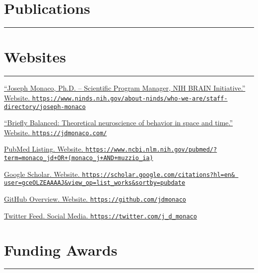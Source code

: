 \documentclass[10pt]{article}
\newcommand{\itemtitle}[1]{{\color{hopkinsblue}\ul{#1}}}
\newcommand{\itemnote}[1]{
  \begin{description}
    \item[$\rightarrow$] \hspace{.09in}{\color{darkgray}\it #1}
  \end{description}
}
\newcommand{\aurl}[1]{{\color{dimgray}\texttt{#1}}}
\newcommand{\newsection}[2]{%
  \section*{#1}
  \vspace{-.125in}
  \hrule
  \vspace{.22in}
  \label{sec:#2}
}
\begin{document}
\newsection{Publications}{pubs}

\renewcommand{\itemnote}[1]{}
%



\smallskip
\newsection{Websites}{web}

\begin{description}
  \item \href{https://www.ninds.nih.gov/about-ninds/who-we-are/staff-directory/joseph-monaco}
    {``\itemtitle{Joseph Monaco, Ph.D. -- Scientific
      Program Manager, NIH BRAIN Initiative}.'' Website.
    \aurl{https://www.ninds.nih.gov/about-ninds/who-we-are/staff-directory/joseph-monaco}}
  \item \href{https://jdmonaco.com/}
    {``\itemtitle{Briefly Balanced: Theoretical neuroscience of behavior in
    space and time}.'' Website. \aurl{https://jdmonaco.com/}}
  \item \href{https://www.ncbi.nlm.nih.gov/pubmed/?term=monaco_jd+OR+(monaco_j+AND+muzzio_ia)}
    {\itemtitle{PubMed Listing}. Website.
    \aurl{https://www.ncbi.nlm.nih.gov/pubmed/?term=monaco\_jd+OR+(monaco\_j+AND+muzzio\_ia)}}
  \item \href{https://jdmonaco.com/google-scholar}
    {\itemtitle{Google Scholar}. Website. \aurl{https://scholar.google.com/citations?hl=en\& user=gceOLZEAAAAJ\&view\_op=list\_works\&sortby=pubdate}}
  \item \href{https://github.com/jdmonaco}
    {\itemtitle{GitHub Overview}. Website. \aurl{https://github.com/jdmonaco}}
  \item \href{https://twitter.com/j_d_monaco}
    {\itemtitle{Twitter Feed}. Social Media. \aurl{https://twitter.com/j\_d\_monaco}}
\end{description}


\renewcommand{\itemnote}[1]{
\begin{description}
\item[$\rightarrow$] \hspace{.09in}{\color{darkgray}\it #1}
\end{description}
}

\smallskip
\newsection{Funding Awards}{grants}
\end{document}
